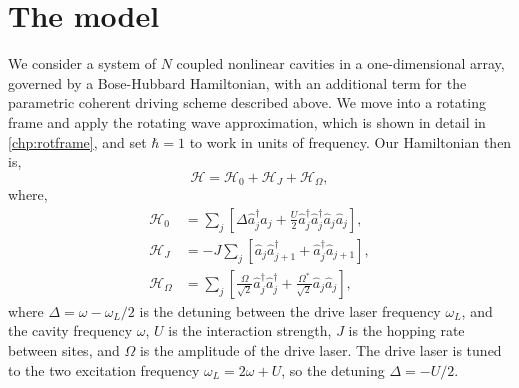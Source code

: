 \section{The model}
We consider a system of \(N\) coupled nonlinear cavities in a one-dimensional array, governed by a Bose-Hubbard Hamiltonian, with an additional term for the parametric coherent driving scheme described above. We move into a rotating frame and apply the rotating wave approximation, which is shown in detail in \cref{chp:rotframe}, and set \(\hbar = 1\) to work in units of frequency. Our Hamiltonian then is,
\begin{equation}
	\mathcal{H} = \mathcal{H}_{0} + \mathcal{H}_{J} + \mathcal{H}_{\Omega},
	\label{eq:dnlca2-1}
\end{equation}
where,
\begin{align}
	\mathcal{H}_{0} &= \sum_{j} \left[ \Delta \hat{a}_{j}^{\dagger}\hat{a}_{j} + \frac{U}{2}\hat{a}_{j}^{\dagger}\hat{a}_{j}^{\dagger}\hat{a}_{j}\hat{a}_{j}\right], \label{eq:dnlca2-2} \\
	\mathcal{H}_{J} &= -J \sum_{j}\left[ \hat{a}_{j}\hat{a}_{j+1}^{\dagger} + \hat{a}_{j}^{\dagger}\hat{a}_{j+1} \right], \label{eq:dnlca2-3} \\
	\mathcal{H}_{\Omega} &= \sum_{j} \left[\frac{\Omega}{\sqrt{2}}\hat{a}_{j}^{\dagger}\hat{a}_{j}^{\dagger} + \frac{\Omega^{*}}{\sqrt{2}}\hat{a}_{j}\hat{a}_{j} \right], \label{eq:dnlca2-4}
\end{align}
where \(\Delta = \omega - \omega_{L}/2\) is the detuning between the drive laser frequency \(\omega_{L}\), and the cavity frequency \(\omega\), \(U\) is the interaction strength, \(J\) is the hopping rate between sites, and \(\Omega\) is the amplitude of the drive laser. The drive laser is tuned to the two excitation frequency \(\omega_{L} = 2\omega + U\), so the detuning \(\Delta = -U/2\). 


